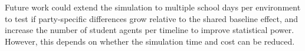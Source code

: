 Future work could extend the simulation to multiple school days per environment to test if party-specific differences grow relative to the shared baseline effect, and increase the number of student agents per timeline to improve statistical power. However, this depends on whether the simulation time and cost can be reduced.